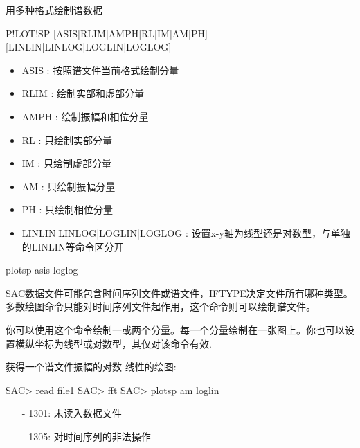 \label{cmd:plotsp}

用多种格式绘制谱数据

\begin{SACSTX}
P!LOT!SP [ASIS|RLIM|AMPH|RL|IM|AM|PH] [LINLIN|LINLOG|LOGLIN|LOGLOG]
\end{SACSTX}

\begin{itemize}
\item ASIS :  按照谱文件当前格式绘制分量
\item RLIM :  绘制实部和虚部分量 
\item AMPH :  绘制振幅和相位分量 
\item RL :  只绘制实部分量 
\item IM :  只绘制虚部分量 
\item AM :  只绘制振幅分量 
\item PH :  只绘制相位分量 
\item LINLIN|LINLOG|LOGLIN|LOGLOG : 设置x-y轴为线型还是对数型，与单独的LINLIN等命令区分开
\end{itemize}

\begin{SACDFT}
plotsp asis loglog
\end{SACDFT}

SAC数据文件可能包含时间序列文件或谱文件，IFTYPE决定文件所有哪种类型。多数绘图命令只能对时间序列文件起作用，这个命令则可以绘制谱文件。

你可以使用这个命令绘制一或两个分量。每一个分量绘制在一张图上。你也可以设置横纵坐标为线型或对数型，其仅对该命令有效.

获得一个谱文件振幅的对数-线性的绘图:
\begin{SACCode}
SAC> read file1
SAC> fft
SAC> plotsp am loglin
\end{SACCode}

\begin{itemize}
\item[-]1301: 未读入数据文件
\item[-]1305: 对时间序列的非法操作
\end{itemize}
